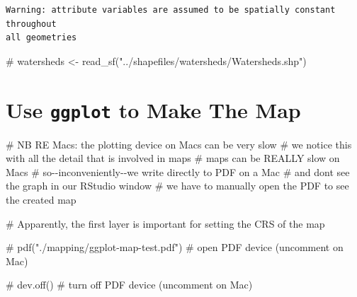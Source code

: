 \documentclass[
  letterpaper,
  DIV=11,
  numbers=noendperiod,
  oneside]{scrreprt}
\newenvironment{Shaded}{\begin{snugshade}}{\end{snugshade}}
\newcommand{\CommentTok}[1]{\textcolor[rgb]{0.37,0.37,0.37}{#1}}
\begin{document}
\begin{verbatim}
Warning: attribute variables are assumed to be spatially constant throughout
all geometries
\end{verbatim}

\begin{Shaded}
\begin{Highlighting}[]
\CommentTok{\# watersheds \textless{}{-} read\_sf("../shapefiles/watersheds/Watersheds.shp")}
\end{Highlighting}
\end{Shaded}

\section{\texorpdfstring{Use \texttt{ggplot} to Make The
Map}{Use ggplot to Make The Map}}\label{use-ggplot-to-make-the-map}

\begin{Shaded}
\begin{Highlighting}[]
\CommentTok{\# NB RE Macs: the plotting device on Macs can be very slow}
\CommentTok{\# we notice this with all the detail that is involved in maps}
\CommentTok{\# maps can be REALLY slow on Macs}
\CommentTok{\# so{-}{-}inconveniently{-}{-}we write directly to PDF on a Mac}
\CommentTok{\# and don\textquotesingle{}t see the graph in our RStudio window}
\CommentTok{\# we have to manually open the PDF to see the created map}

\CommentTok{\# Apparently, the first layer is important for setting the CRS of the map}

\CommentTok{\# pdf("./mapping/ggplot{-}map{-}test.pdf") \# open PDF device (uncomment on Mac)}

\CommentTok{\# dev.off() \# turn off PDF device (uncomment on Mac)}
\end{Highlighting}
\end{Shaded}
\end{document}
